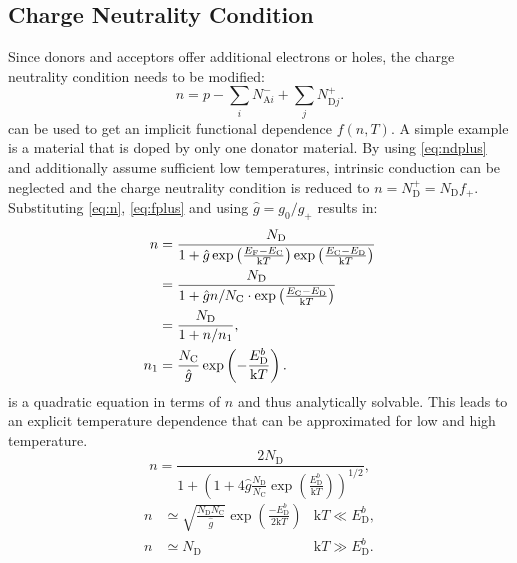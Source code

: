 \subsection{Charge Neutrality Condition}
Since donors and acceptors offer additional electrons or holes, the charge neutrality 
condition needs to be modified:
\begin{equation}
	n = p -\sum_i N_{\mathrm{A}i}^- + \sum_j N_{\mathrm{D}j}^+.
	\label{eq:charge_neutrality}
\end{equation}
 can be used to get an implicit functional dependence $f(n,T)$.
A simple example is a material that is doped by only one donator material.
By using \cref{eq:ndplus} and additionally assume sufficient low
temperatures, intrinsic conduction can be neglected and the charge
neutrality condition is reduced to $n = N_\mathrm{D}^+=N_\mathrm{D} f_+$.
Substituting \cref{eq:n}, \cref{eq:fplus} and using $\hat{g}=g_0/g_+$
results in:
\begin{align}
	\notag
	n& =\frac{N_{\mathrm{D}}}{1+\hat{g}\exp\left( 
		\frac{E_{\mathrm{F}}-E_{\mathrm{C}}}{\mathrm{k}T} \right)
		\exp\left( \frac{E_{\mathrm{C}}-E_{\mathrm{D}}}{\mathrm{k}T} \right)}\\
		\notag
	& =\frac{N_{\mathrm{D}}}{1+ \hat{g}n /N_{\mathrm{C}}\cdot\exp\left( 
		\frac{E_{\mathrm{C}}-E_{\mathrm{D}}}{\mathrm{k}T} \right)} \label{eq:n_quad} \\
	& =\frac{N_{\mathrm{D}}}{1+n / n_{1}},\\
	n_{1} & =	\frac{N_{\mathrm{C}}}{\hat{g}}
	\exp\left( -\frac{E_{\mathrm{D}}^{b}}{\mathrm{k}T} \right).
\end{align}
 is a quadratic equation in terms of $n$ and thus
analytically solvable.
This leads to an explicit temperature dependence that can be approximated
for low and high temperature. 
\begin{equation}
	\label{eq:n_T}
	n = \frac{2N_{\mathrm{D}}}{1+\left( 1+4\hat{g} \frac{N_{\mathrm{D}}}{N_{\mathrm{C}}}
	\exp\left( \frac{E_{\mathrm{D}}^{b}}{\mathrm{k}T} \right) \right)^{1/2}},
\end{equation}
\begin{align}
	\label{eq:n_T_approx_low}
	n & \simeq \sqrt{ \frac{N_{\mathrm{D}}N_{\mathrm{C}}}{\hat{g}}}
	\exp\left( \frac{-E_{\mathrm{D}}^{b}}{2 \mathrm{k}T} \right) & \mathrm{k}T\ll 
	E_{\mathrm{D}}^{b}, \\
	\label{eq:n_T_approx_high}
	n & \simeq N_{\mathrm{D}} & \mathrm{k}T\gg E_{\mathrm{D}}^{b}.
\end{align}

